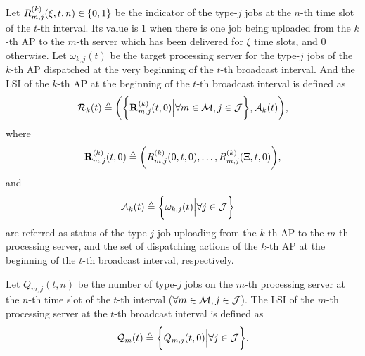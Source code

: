 \begin{definition}
    Let $R^{(k)}_{m,j}(\xi,t,n) \in \{0,1\}$ be the indicator of the type-$j$ jobs at the $n$-th time slot of the $t$-th interval.
    Its value is $1$ when there is one job being uploaded from the $k$-th AP to the $m$-th server which has been delivered for $\xi$ time slots, and $0$ otherwise.
    Let $\omega_{k,j}(t)$ be the target processing server for the type-$j$ jobs of the $k$-th AP dispatched at the very beginning of the $t$-th broadcast interval.
    And the LSI of the $k$-th AP at the beginning of the $t$-th broadcast interval is defined as
    {\small
    \begin{align}
        \mathcal{R}_{k}(t) \triangleq
        \bigg(
            \bigg\{\mathbf{R}^{(k)}_{m,j}(t,0) \Big| \forall m\in\mathcal{M},j\in\mathcal{J}\bigg\},
            \mathcal{A}_{k}(t)
        \bigg),
    \end{align}
    }%
    where
    {\small
    \begin{align}
        \mathbf{R}^{(k)}_{m,j}(t,0) \triangleq \bigg(
            R^{(k)}_{m,j}(0,t,0), \dots, R^{(k)}_{m,j}(\Xi,t,0)
        \bigg),
    \end{align}
    }%
    and
    {\small
    \begin{align}
        \mathcal{A}_{k}(t) &\triangleq \bigg\{\omega_{k,j}(t) \Big| \forall j\in\mathcal{J}\bigg\}
    \end{align}
    }%
    are referred as status of the type-$j$ job uploading from the $k$-th AP to the $m$-th processing server, and the set of dispatching actions of the $k$-th AP at the beginning of the $t$-th broadcast interval, respectively.
\end{definition}

\begin{definition}
    Let $Q_{m,j}({t,n})$ be the number of type-$j$ jobs on the $m$-th processing server at the $n$-th time slot of the $t$-th interval ($\forall m\in\mathcal{M}, j\in\mathcal{J}$).
    The LSI of the $m$-th processing server at the $t$-th broadcast interval is defined as
    {\small
    \begin{align}
        \mathcal{Q}_{m}(t) \triangleq \bigg\{
            Q_{m,j}(t, 0) \Big| \forall j\in\mathcal{J}
        \bigg\}.
    \end{align}
    }%
\end{definition}

